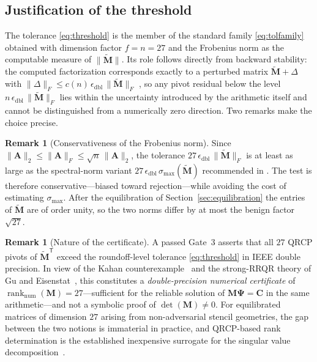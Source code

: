 \documentclass[11pt,a4paper]{article}
\theoremstyle{definition}
\newtheorem{remark}[theorem]{Remark}
\newcommand{\eps}{\epsilon_{\mathrm{dbl}}}
\newcommand{\Mt}{\widetilde{\bm M}}
\newcommand{\normF}[1]{\|#1\|_{F}}
\newcommand{\rankn}{\operatorname{rank}_{\mathrm{num}}}
\begin{document}
\subsection{Justification of the threshold}

The tolerance \eqref{eq:threshold} is the member of the standard
family \eqref{eq:tolfamily} obtained with dimension factor
$f=n=27$ and the Frobenius norm as the computable measure of
$\|\Mt\|$. Its role follows directly from backward stability: the
computed factorization corresponds exactly to a perturbed matrix
$\Mt+\Delta$ with $\normF{\Delta}\le c(n)\,\eps\,\normF{\Mt}$
\cite[Thm.~19.4]{higham2002}, so any pivot residual below the level
$n\,\eps\,\normF{\Mt}$ lies within the uncertainty introduced by the
arithmetic itself and cannot be distinguished from a numerically zero
direction. Two remarks make the choice precise.

\begin{remark}[Conservativeness of the Frobenius norm]
Since $\|\bm A\|_{2}\le\normF{\bm A}\le\sqrt{n}\,\|\bm A\|_{2}$, the
tolerance $27\,\eps\,\normF{\Mt}$ is at least as large as the
spectral-norm variant $27\,\eps\,\sigma_{\max}(\Mt)$
recommended in \cite[\S5.4.1]{golubvanloan2013}. The test is
therefore conservative---biased toward rejection---while avoiding
the cost of estimating $\sigma_{\max}$. After the equilibration of
Section~\ref{sec:equilibration} the entries of $\Mt$ are of order
unity, so the two norms differ by at most the benign factor
$\sqrt{27}$.
\end{remark}

\begin{remark}[Nature of the certificate]
\label{rem:certificate}
A passed Gate~3 asserts that all $27$ QRCP pivots of $\Mt^{\mathsf T}$
exceed the roundoff-level tolerance \eqref{eq:threshold} in IEEE
double precision. In view of the Kahan
counterexample~\cite{kahan1966} and the strong-RRQR theory of Gu and
Eisenstat~\cite{gueisenstat1996}, this constitutes a
\emph{double-precision numerical certificate} of
$\rankn(\bm M)=27$---sufficient for the reliable solution of
$\bm M\bm\Psi=\bm C$ in the same arithmetic---and not a symbolic proof
of $\det(\bm M)\neq0$. For equilibrated matrices of dimension $27$
arising from non-adversarial stencil geometries, the gap between the
two notions is immaterial in practice, and QRCP-based rank
determination is the established inexpensive surrogate for the
singular value decomposition~\cite{chan1987,lapack1999}.
\end{remark}
\end{document}
